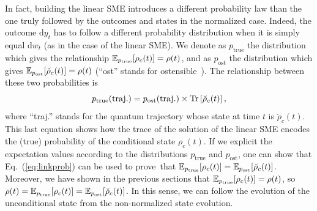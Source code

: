 In fact, building the linear SME introduces a different probability law than the one truly followed by the outcomes and states in the normalized case. Indeed, the outcome $\mathrm{d}y_t$ has to follow a different probability distribution when it is simply equal $\mathrm{d}w_t$ (as in the case of the linear SME). We denote as $p_\text{true}$ the distribution which gives the relationship $\mathbb{E}_{p_\text{true}}\qty[\rho_c(t)]=\rho(t)$, and as $p_\text{ost}$ the distribution which gives $\mathbb{E}_{p_\text{ost}}\qty[\breve{\rho}_c(t)]=\rho(t)$  (``ost'' stands for ostensible~\cite{WM}). The relationship between these two probabilities is
\begin{equation}\label{eq:linkprob}
    p_\text{true}(\text{traj.})=p_\text{ost}(\text{traj.})\times\operatorname{Tr}\left[\breve{\rho}_c(t)\right],
\end{equation} 
where ``traj.'' stands for the quantum trajectory whose state at time $t$ is $\breve{\rho}_c(t)$. This last equation shows how the trace of the solution of the linear SME encodes the (true) probability of the conditional state $\rho_c(t)$. If we explicit the expectation values according to the distributions $p_\text{true}$ and $p_\text{ost}$, one can show that Eq.~(\ref{eq:linkprob}) can be used to prove\footnotemark~that $\mathbb{E}_{p_\text{true}}\qty[\rho_c(t)]=\mathbb{E}_{p_\text{ost}}\qty[\breve{\rho}_c(t)]$. Moreover, we have shown in the previous sections that $\mathbb{E}_{p_\text{true}}\qty[\rho_c(t)]=\rho(t)$, so $\rho(t)=\mathbb{E}_{p_\text{true}}\qty[\rho_c(t)]=\mathbb{E}_{p_\text{ost}}\qty[\breve{\rho}_c(t)]$. In this sense, we can follow the evolution of the unconditional state from the non-normalized state evolution.

